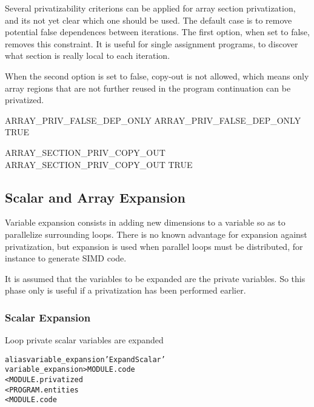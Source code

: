 \documentclass[a4paper]{report}
\newenvironment{PipsMake}{\begin{alltt}}{\end{alltt}}
\newenvironment{PipsPass}[1]{\label{pass:#1}}{}
\begin{document}
Several privatizability criterions can be applied for array
section privatization, and its not yet clear which one should be used. The
default case is to remove potential false dependences between
iterations. The first option, when set to false, removes this
constraint. It is useful for single assignment programs, to discover
what section is really local to each iteration.

When the second option is set to false, copy-out is not allowed,
which means only array regions that are not further reused in the program
continuation can be privatized.

\begin{PipsProp}{ARRAY_PRIV_FALSE_DEP_ONLY}
ARRAY_PRIV_FALSE_DEP_ONLY TRUE
\end{PipsProp}

\begin{PipsProp}{ARRAY_SECTION_PRIV_COPY_OUT}
ARRAY_SECTION_PRIV_COPY_OUT TRUE
\end{PipsProp}


\subsection{Scalar and Array Expansion}
\label{subsection-scalar-and-array-expansion}

Variable expansion consists in adding new dimensions to a variable so as
to parallelize surrounding loops. There is no known advantage for
expansion against privatization, but expansion is used when parallel loops
must be distributed, for instance to generate SIMD code.

It is assumed that the variables to be expanded are the private
variables. So this phase only is useful if a privatization has been
performed earlier.

\subsubsection{Scalar Expansion}

\begin{PipsPass}{variable_expansion}
Loop private scalar variables are expanded
\end{PipsPass}

\begin{PipsMake}
alias variable_expansion 'Expand Scalar'
variable_expansion                    > MODULE.code
        < MODULE.privatized
        < PROGRAM.entities
        < MODULE.code
\end{PipsMake}
\end{document}
